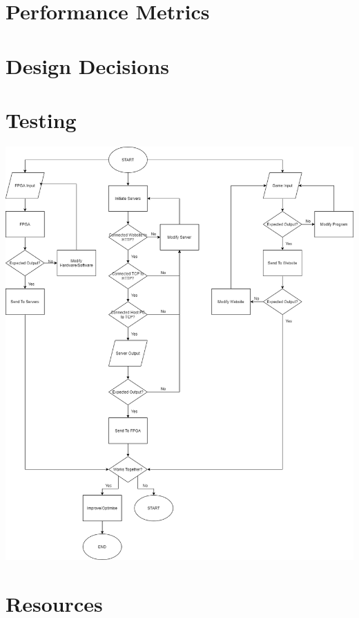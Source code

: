 \documentclass[12pt,a4paper]{article}
\begin{document}
\section{Performance Metrics}

\section{Design Decisions}

\section{Testing}
\includegraphics[width = 15cm]{Flowchart.png}

\section{Resources}
\end{document}
